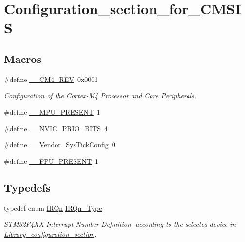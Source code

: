 \hypertarget{group___configuration__section__for___c_m_s_i_s}{\section{Configuration\-\_\-section\-\_\-for\-\_\-\-C\-M\-S\-I\-S}
\label{group___configuration__section__for___c_m_s_i_s}
}
\subsection*{Macros}
\begin{DoxyCompactItemize}
\item 
\#define \hyperlink{group___configuration__section__for___c_m_s_i_s_ga45a97e4bb8b6ce7c334acc5f45ace3ba}{\-\_\-\-\_\-\-C\-M4\-\_\-\-R\-E\-V}~0x0001
\begin{DoxyCompactList}\small\item\em Configuration of the Cortex-\/\-M4 Processor and Core Peripherals. \end{DoxyCompactList}\item 
\#define \hyperlink{group___configuration__section__for___c_m_s_i_s_ga4127d1b31aaf336fab3d7329d117f448}{\-\_\-\-\_\-\-M\-P\-U\-\_\-\-P\-R\-E\-S\-E\-N\-T}~1
\item 
\#define \hyperlink{group___configuration__section__for___c_m_s_i_s_gae3fe3587d5100c787e02102ce3944460}{\-\_\-\-\_\-\-N\-V\-I\-C\-\_\-\-P\-R\-I\-O\-\_\-\-B\-I\-T\-S}~4
\item 
\#define \hyperlink{group___configuration__section__for___c_m_s_i_s_gab58771b4ec03f9bdddc84770f7c95c68}{\-\_\-\-\_\-\-Vendor\-\_\-\-Sys\-Tick\-Config}~0
\item 
\#define \hyperlink{group___configuration__section__for___c_m_s_i_s_gac1ba8a48ca926bddc88be9bfd7d42641}{\-\_\-\-\_\-\-F\-P\-U\-\_\-\-P\-R\-E\-S\-E\-N\-T}~1
\end{DoxyCompactItemize}
\subsection*{Typedefs}
\begin{DoxyCompactItemize}
\item 
\hypertarget{group___configuration__section__for___c_m_s_i_s_gac3af4a32370fb28c4ade8bf2add80251}{typedef enum \hyperlink{group___configuration__section__for___c_m_s_i_s_ga666eb0caeb12ec0e281415592ae89083}{I\-R\-Qn} \hyperlink{group___configuration__section__for___c_m_s_i_s_gac3af4a32370fb28c4ade8bf2add80251}{I\-R\-Qn\-\_\-\-Type}}\label{group___configuration__section__for___c_m_s_i_s_gac3af4a32370fb28c4ade8bf2add80251}

\begin{DoxyCompactList}\small\item\em S\-T\-M32\-F4\-X\-X Interrupt Number Definition, according to the selected device in \hyperlink{group___library__configuration__section}{Library\-\_\-configuration\-\_\-section}. \end{DoxyCompactList}\end{DoxyCompactItemize}

